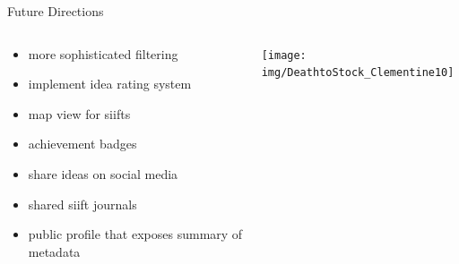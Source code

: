 \begin{frame}{Future Directions}
\begin{columns}
\begin{column}{0.5\textwidth}
\begin{itemize}
  \item more sophisticated filtering
  \item implement idea rating system
  \item map view for siifts
  \item achievement badges
    \item share ideas on social media
    \item shared siift journals
    \item public profile that exposes summary of metadata
\end{itemize}
\end{column}
\begin{column}{0.5\textwidth}  %
    \begin{center}
     \texttt{[image: img/DeathtoStock\_Clementine10]}
     \end{center}
\end{column}
\end{columns}

\end{frame}
